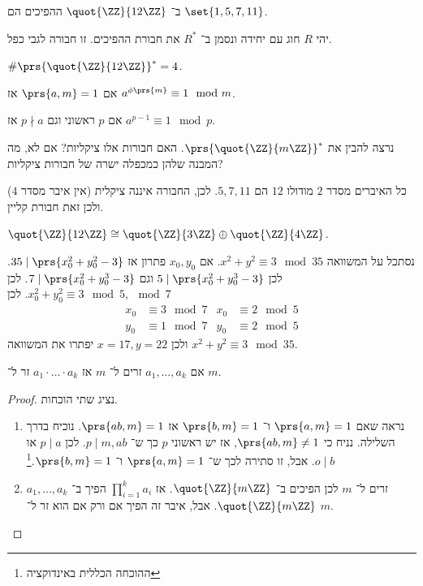 \documentclass[a4paper,10pt,twoside,openany]{book}
\begin{document}
\begin{example}
ב־%
$\quot{\ZZ}{12\ZZ}$
ההפיכים הם
$\set{1,5,7,11}$.
\end{example}
\begin{definition}
יהי
$R$
חוג עם יחידה ונסמן ב־%
$R^*$
את חבורת ההפיכים. זו חבורה לגבי כפל.
\end{definition}

\begin{example}
$\#\prs{\quot{\ZZ}{12\ZZ}}^* = 4$.
\end{example}
\begin{theorem}
אם
$\prs{a,m} = 1$
אז
$a^{\phi\prs{m}} \equiv 1 \mod{m}$.
\end{theorem}
\begin{theorem}
אם
$p$
ראשוני וגם
$p \nmid a$
אז
$a^{p-1} \equiv 1\mod{p}$.
\end{theorem}

נרצה להבין את
$\prs{\quot{\ZZ}{m\ZZ}}^*$.
האם חבורות אלו ציקליות? אם לא, מה המבנה שלהן כמכפלה ישרה של חבורות ציקליות?

\begin{example}
כל האיברים מסדר
$2$
מודולו
$12$
הם
$5,7,11$.
לכן, החבורה איננה ציקלית (אין איבר מסדר
$4$)
ולכן זאת חבורת קליין.
\end{example}

\begin{example}
$\quot{\ZZ}{12\ZZ} \cong \quot{\ZZ}{3\ZZ}\oplus\quot{\ZZ}{4\ZZ}$.
\end{example}

\begin{example}
נסתכל על המשוואה
$x^2 + y^2 \equiv 3 \mod{35}$.
אם
$x_0, y_0$
פתרון אז
$35 \mid \prs{x_0^2 + y_0^2 - 3}$.
לכן
$5 \mid \prs{x_0^2 + y_0^3 - 3}$
וגם
$7 \mid \prs{x_0^2 + y_0^3 - 3}$.
לכן
$x_0^2 + y_0^2 \equiv 3 \mod{5}, \mod{7}$.
לכן
\begin{align*}
x_0 &\equiv 3 \mod{7} & x_0 &\equiv 2 \mod{5} \\
y_0 &\equiv 1 \mod{7} & y_0 &\equiv 2 \mod{5}
\end{align*}
ולכן
$x = 17, y = 22$
יפתרו את המשוואה
$x^2 + y^2 \equiv 3\mod{35}$.
\end{example}
\begin{lemma}
אם
$a_1, \ldots, a_k$
זרים ל־%
$m$
אז
$a_1\cdot\ldots\cdot a_k$
זר ל־%
$m$.
\end{lemma}

\begin{proof}
נציג שתי הוכחות.
\begin{enumerate}
\item
נראה שאם
$\prs{a,m} = 1$
ו־%
$\prs{b,m} = 1$
אז
$\prs{ab,m} = 1$.
נוכיח בדרך השלילה.
נניח כי
$\prs{ab,m}\neq 1$,
אז יש ראשוני
$p$
כך ש־%
$p \mid m,ab$.
לכן
$p \mid a$
או
$o \mid b$.
אבל, זו סתירה לכך ש־%
$\prs{a,m} = 1$
ו־%
$\prs{b,m} = 1$.\footnote{ההוכחה הכללית באינדוקציה}
\item
$a_1, \ldots, a_k$
זרים ל־%
$m$
לכן
הפיכים ב־%
$\quot{\ZZ}{m\ZZ}$.
אז
$\prod_{i=1}^k a_i$
הפיך ב־%
$\quot{\ZZ}{m\ZZ}$.
אבל,
איבר זה הפיך אם ורק אם הוא זר ל־%
$m$.
\end{enumerate}
\end{proof}
\end{document}
